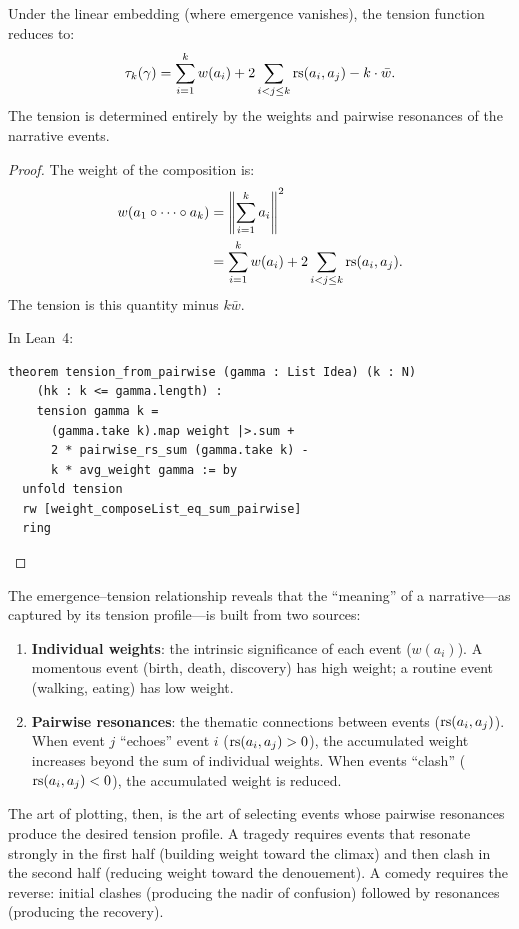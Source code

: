 \begin{theorem}
\label{thm:emergence-tension}
Under the linear embedding (where emergence vanishes), the tension function
reduces to:
\[
  \tau_k(\gamma) = \sum_{i=1}^{k} w(a_i) + 2\sum_{i < j \leq k} \mathrm{rs}(a_i, a_j)
  - k \cdot \bar{w}.
\]
The tension is determined entirely by the weights and pairwise resonances of
the narrative events.
\end{theorem}

\begin{proof}
The weight of the composition is:
\begin{align*}
  w(a_1 \circ \cdots \circ a_k)
  &= \left\|\sum_{i=1}^k a_i\right\|^2 \\
  &= \sum_{i=1}^k w(a_i) + 2\sum_{i < j \leq k} \mathrm{rs}(a_i, a_j).
\end{align*}
The tension is this quantity minus $k \bar{w}$.

In Lean~4:
\begin{lstlisting}
theorem tension_from_pairwise (gamma : List Idea) (k : N)
    (hk : k <= gamma.length) :
    tension gamma k =
      (gamma.take k).map weight |>.sum +
      2 * pairwise_rs_sum (gamma.take k) -
      k * avg_weight gamma := by
  unfold tension
  rw [weight_composeList_eq_sum_pairwise]
  ring
\end{lstlisting}
\end{proof}

\begin{interpretation}
\label{interp:narrative-meaning}
The emergence--tension relationship reveals that the ``meaning'' of a
narrative---as captured by its tension profile---is built from two sources:

\begin{enumerate}
\item \textbf{Individual weights}: the intrinsic significance of each event
($w(a_i)$).  A momentous event (birth, death, discovery) has high weight; a
routine event (walking, eating) has low weight.

\item \textbf{Pairwise resonances}: the thematic connections between events
($\mathrm{rs}(a_i, a_j)$).  When event $j$ ``echoes'' event $i$ ($\mathrm{rs}(a_i, a_j) > 0$),
the accumulated weight increases beyond the sum of individual weights.  When
events ``clash'' ($\mathrm{rs}(a_i, a_j) < 0$), the accumulated weight is reduced.
\end{enumerate}

The art of plotting, then, is the art of selecting events whose pairwise
resonances produce the desired tension profile.  A tragedy requires events
that resonate strongly in the first half (building weight toward the climax)
and then clash in the second half (reducing weight toward the denouement).
A comedy requires the reverse: initial clashes (producing the nadir of
confusion) followed by resonances (producing the recovery).
\end{interpretation}



